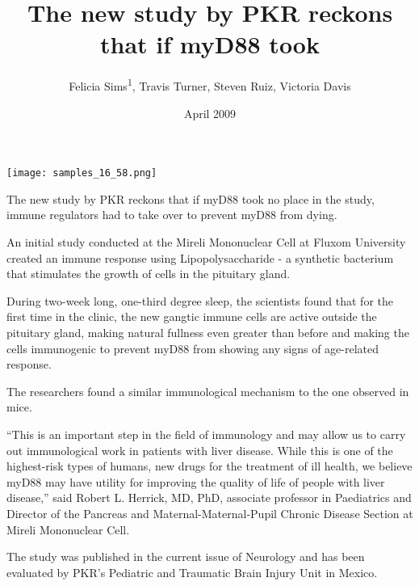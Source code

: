 \documentclass{article}
\title{The new study by PKR reckons that if myD88 took}
\author{Felicia Sims\textsuperscript{1},  Travis Turner,  Steven Ruiz,  Victoria Davis}
\affil{\textsuperscript{1}Cote d'Azur University}
\date{April 2009}
\begin{document}
\maketitle

\begin{center}
\begin{minipage}{0.75\linewidth}
\texttt{[image: samples\_16\_58.png]}
\end{minipage}
\end{center}

The new study by PKR reckons that if myD88 took no place in the study, immune regulators had to take over to prevent myD88 from dying.

An initial study conducted at the Mireli Mononuclear Cell at Fluxom University created an immune response using Lipopolysaccharide - a synthetic bacterium that stimulates the growth of cells in the pituitary gland.

During two-week long, one-third degree sleep, the scientists found that for the first time in the clinic, the new gangtic immune cells are active outside the pituitary gland, making natural fullness even greater than before and making the cells immunogenic to prevent myD88 from showing any signs of age-related response.

The researchers found a similar immunological mechanism to the one observed in mice.

“This is an important step in the field of immunology and may allow us to carry out immunological work in patients with liver disease. While this is one of the highest-risk types of humans, new drugs for the treatment of ill health, we believe myD88 may have utility for improving the quality of life of people with liver disease,” said Robert L. Herrick, MD, PhD, associate professor in Paediatrics and Director of the Pancreas and Maternal-Maternal-Pupil Chronic Disease Section at Mireli Mononuclear Cell.

The study was published in the current issue of Neurology and has been evaluated by PKR’s Pediatric and Traumatic Brain Injury Unit in Mexico.
\end{document}
